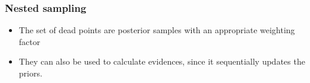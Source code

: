 \documentclass[%
]{beamer}
\newcommand{\lik}{\mathcal{L}}
\newcommand{\ev}{\mathcal{Z}}
\begin{document}
%
% 
%
%
%
%
%


\begin{frame}
  \frametitle{Nested sampling} 

  \begin{itemize}
    \pause\item The set of dead points are posterior samples with an appropriate weighting factor
    \pause\item They can also be used to calculate evidences, since it sequentially updates the priors.
  \end{itemize}
 
\end{frame}
\end{document}
